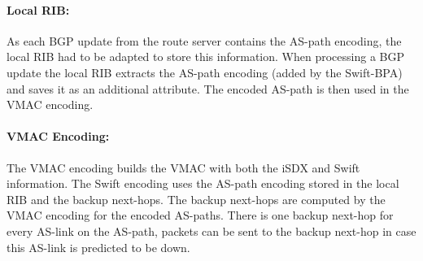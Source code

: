 \paragraph{\label{chapter4:Changes to the iSDX:local RIB}Local RIB:}

As each BGP update from the route server contains the AS-path encoding, the local RIB had to be adapted to store this information. 
When processing a BGP update the local RIB extracts the AS-path encoding (added by the Swift-BPA) and saves it as an additional attribute. The encoded AS-path is then used in the VMAC encoding. 

\paragraph{\label{chapter4:Changes to the iSDX:Vmac Encoding}VMAC Encoding:}
The VMAC encoding builds the VMAC with both  the iSDX and Swift information. The Swift encoding uses the AS-path encoding stored in the local RIB and the backup next-hops. The backup next-hops are computed by the VMAC encoding for the encoded AS-paths. There is one backup next-hop for every AS-link on the AS-path, packets can be sent to the backup next-hop in case this AS-link is predicted to be down. \\

\newpage
